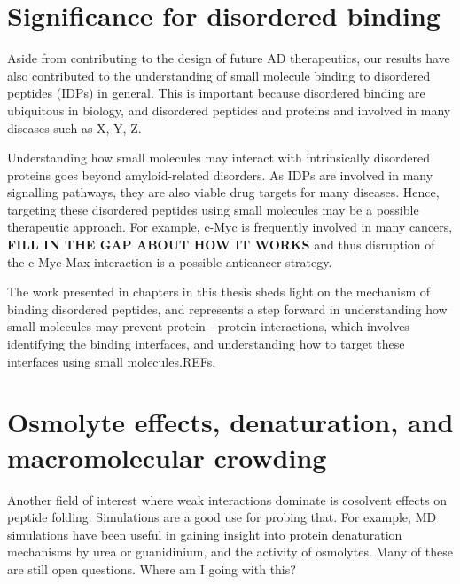 \section{Significance for disordered binding}
Aside from contributing to the design of future AD therapeutics, our results have also contributed to the understanding of small molecule binding to disordered peptides (IDPs) in general. This is important because disordered binding are ubiquitous in biology, and disordered peptides and proteins and involved in many diseases such as X, Y, Z.  

Understanding how small molecules may interact with intrinsically disordered proteins goes beyond amyloid-related disorders. As IDPs are involved in many signalling pathways, they are also viable drug targets for many diseases.   Hence, targeting these disordered peptides using small molecules may be a possible therapeutic approach. For example, c-Myc is frequently involved in many cancers, \textbf{FILL IN THE GAP ABOUT HOW IT WORKS} and thus disruption of the c-Myc-Max interaction is a possible anticancer strategy.\cite{Iakoucheva:2002uv,Metallo:2010p6822,Cuchillo:2012bm}

The work presented in chapters in this thesis sheds light on the mechanism of binding disordered peptides, and represents a step forward in understanding how small molecules may prevent protein - protein interactions, which involves identifying the binding interfaces, and understanding how to target these interfaces using small molecules.REFs.

\section{Osmolyte effects, denaturation, and macromolecular crowding}
Another field of interest where weak interactions dominate is cosolvent effects on peptide folding. Simulations are a good use for probing that.  For example, MD simulations have been useful in gaining insight into protein denaturation mechanisms by urea or guanidinium, and the activity of osmolytes. Many of these are still open questions.\cite{http://pubs.acs.org/doi/abs/10.1021/jp200625k -- crowding and protein association.} Where am I going with this?

